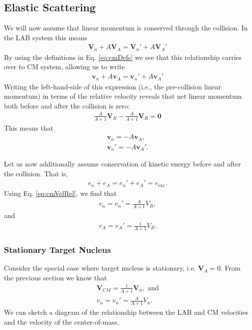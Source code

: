 \documentclass[11pt]{article}
\renewcommand\vec{\mathbf}
\begin{document}
\subsection{Elastic Scattering}
\label{sec:orgheadline4}
We will now assume that linear momentum is conserved through the collision.  In the LAB system this means
\begin{align}
  \vec{V}_n + A\vec{V}_A = \vec{V}_n' + A\vec{V}_A'
\end{align}
By using the definitions in Eq. \eqref{eq:cmDefs} we see that this relationship carries over to CM system, allowing us to write
\begin{align}
  \vec{v}_n + A\vec{v}_A = \vec{v}_n' + A\vec{v}_A'
\end{align}
Writing the left-hand-side of this expression (i.e., the pre-collision linear momentum) in terms of the relative velocity reveals that net linear momentum both before and after the collision is zero:
\begin{align}
  \frac{A}{A+1}\vec{V}_R - \frac{A}{A+1}\vec{V}_R = \vec{0}
\end{align}
This means that
\begin{align}
  \vec{v}_n = -A \vec{v}_A, \\
  \vec{v}_n' = -A \vec{v}_A'.
\end{align}

Let us now additionally assume conservation of kinetic energy before and after the collision.  That is, 
\begin{align}
  e_n + e_A = e_n' + e_A' = e_{\text{exc}}.
\end{align}
Using Eq. \eqref{eq:cmVelRel}, we find that 
\begin{align}
  v_n = v_n' = \frac{A}{A+1}V_R,
\end{align}
and
\begin{align}
  v_A = v_A' = \frac{1}{A+1}V_R.
\end{align}

\subsubsection{Stationary Target Nucleus}
\label{sec:orgheadline3}
Consider the special case where target nucleus is stationary, i.e. \(\vec{V}_A = 0\).  From the previous section we know that
\begin{align}
  \vec{V}_{CM} = \frac{1}{A+1} \vec{V}_n, \text{ and} \\
  v_n = v_n' = \frac{A}{A+1}V_n.
\end{align}
We can sketch a diagram of the relationship between the LAB and CM velocities and the velocity of the center-of-mass.
\end{document}
